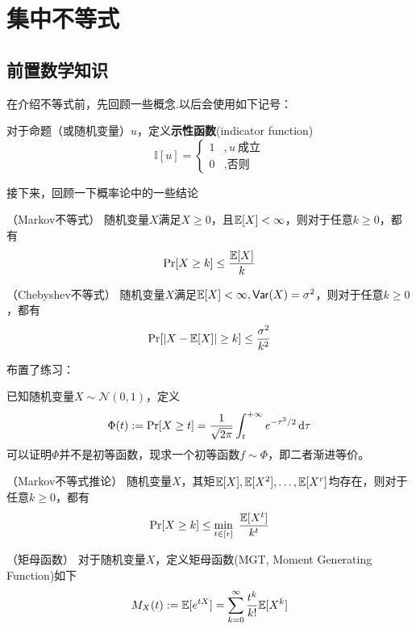 \chapter{集中不等式}

\section{前置数学知识}

在介绍不等式前，先回顾一些概念.以后会使用如下记号：
\begin{definition}
    对于命题（或随机变量）$u$，定义\textbf{示性函数}(indicator function)
    \[
    \mathbb{I}[u] = \begin{cases}
        1 &, u \ \text{成立} \\
        0 &, \text{否则}
    \end{cases}
    \]
\end{definition}

接下来，回顾一下概率论中的一些结论
\begin{theorem}（Markov不等式）
    随机变量$X$满足$X\ge 0$，且$\E[X] < \infty$，则对于任意$k \ge 0$，都有 
    \[
    \Pr[X \ge k] \le \dfrac{\E[X]}{k}
    \]
\end{theorem}
\begin{theorem}（Chebyshev不等式）
    随机变量$X$满足$\E[X] < \infty, \var(X) = \sigma^2$，则对于任意$k \ge 0$，都有 
    \[
    \Pr[\abs{X - \E[X]} \ge k] \le \dfrac{\sigma^2}{k^2}
    \]
\end{theorem}

布置了练习：
\begin{exercise} \label{exr:taildistrib}
已知随机变量$X \sim \mathcal{N}(0, 1)$，定义 
\[
\Phi(t) := \Pr[X \ge t] = \dfrac{1}{\sqrt{2\pi}}\int_{t}^{+\infty} e^{-\tau^2/2} \dx[\tau]
\]
可以证明$\Phi$并不是初等函数，现求一个初等函数$f \sim \Phi$，即二者渐进等价。
\end{exercise}

\begin{corollary}（Markov不等式推论）
    随机变量$X$，其矩$\E[X], \E[X^2], \dots, \E[X^r]$均存在，则对于任意$k \ge 0$，都有 
    \[
    \Pr[X \ge k] \le \min_{t\in [r]}\ \dfrac{\E[X^t]}{k^t}
    \]
\end{corollary}

\begin{definition}（矩母函数）
    对于随机变量$X$，定义矩母函数(MGT, Moment Generating Function)如下
    \[
    M_X(t) := \E[e^{tX}] = \sum_{k=0}^{\infty} \dfrac{t^k}{k!} \E[X^k]
    \]
\end{definition}


